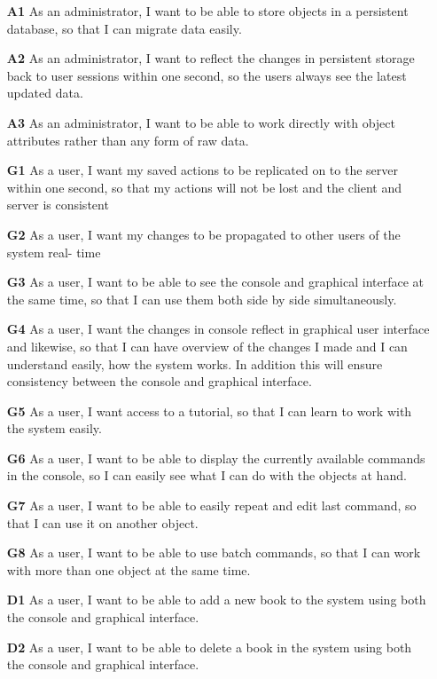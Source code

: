 \begin{itemize}
  \item [\textbf{A1}] As an administrator, I want to be able to store objects in a persistent database, so that I can migrate data easily.
  \item [\textbf{A2}] As an administrator, I want to reflect the changes in persistent storage back to user sessions within one second, so the users always see the latest updated data.
  \item [\textbf{A3}] As an administrator, I want to be able to work directly with object attributes rather than any form of raw data.
  \item [\textbf{G1}] As a user, I want my saved actions to be replicated on to the server within one second, so that my actions will not be lost and the client and server is consistent
  \item [\textbf{G2}] As a user, I want my changes to be propagated to other users of the system real- time
  \item [\textbf{G3}] As a user, I want to be able to see the console and graphical interface at the same time, so that I can use them both side by side simultaneously.
  \item [\textbf{G4}] As a user, I want the changes in console reflect in graphical user interface and likewise, so that I can have overview of the changes I made and I can understand easily, how the system works. In addition this will ensure consistency between the console and graphical interface.
  \item [\textbf{G5}] As a user, I want access to a tutorial, so that I can learn to work with the system easily.
  \item [\textbf{G6}] As a user, I want to be able to display the currently available commands in the console, so I can easily see what I can do with the objects at hand.
  \item [\textbf{G7}] As a user, I want to be able to easily repeat and edit last command, so that I can use it on another object.
  \item [\textbf{G8}] As a user, I want to be able to use batch commands, so that I can work with more than one object at the same time.
  \item [\textbf{D1}] As a user, I want to be able to add a new book to the system using both the console and graphical interface.
  \item [\textbf{D2}] As a user, I want to be able to delete a book in the system using both the console and graphical interface.

\end{itemize}
